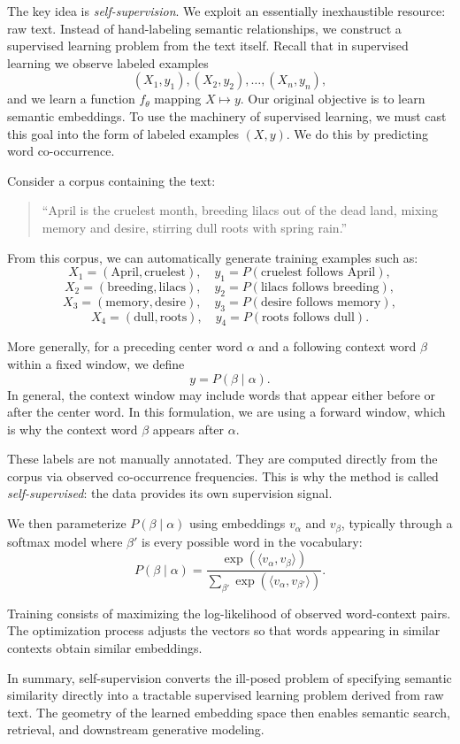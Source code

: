 \medskip

The key idea is \emph{self-supervision}. We exploit an essentially inexhaustible resource: raw text. Instead of hand-labeling semantic relationships, we construct a supervised learning problem from the text itself. Recall that in supervised learning we observe labeled examples
\[
(X_1, y_1), (X_2, y_2), \dots, (X_n, y_n),
\]
and we learn a function $f_\theta$ mapping $X \mapsto y$. Our original objective is to learn semantic embeddings. To use the machinery of supervised learning, we must cast this goal into the form of labeled examples $(X,y)$. We do this by predicting word co-occurrence.

Consider a corpus containing the text:
\begin{quote}
``April is the cruelest month, breeding lilacs out of the dead land, mixing memory and desire, stirring dull roots with spring rain.''
\end{quote}

From this corpus, we can automatically generate training examples such as:
\[
X_1 = (\text{April}, \text{cruelest}), 
\quad 
y_1 = P(\text{cruelest follows April}),
\]
\[
X_2 = (\text{breeding}, \text{lilacs}), 
\quad 
y_2 = P(\text{lilacs follows breeding}),
\]
\[
X_3 = (\text{memory}, \text{desire}), 
\quad 
y_3 = P(\text{desire follows memory}),
\]
\[
X_4 = (\text{dull}, \text{roots}), 
\quad 
y_4 = P(\text{roots follows dull}).
\]

More generally, for a preceding center word $\alpha$ and a following context word $\beta$ within a fixed window, we define
\[
y = P(\beta \mid \alpha).
\]
In general, the context window may include words that appear either before or after the center word. In this formulation, we are using a forward window, which is why the context word $\beta$ appears after $\alpha$.

These labels are not manually annotated. They are computed directly from the corpus via observed co-occurrence frequencies. This is why the method is called \emph{self-supervised}: the data provides its own supervision signal.

\medskip

We then parameterize $P(\beta \mid \alpha)$ using embeddings $v_\alpha$ and $v_\beta$, typically through a softmax model where $\beta'$ is every possible word in the vocabulary:
\[
P(\beta \mid \alpha)
=
\frac{\exp(\langle v_\alpha, v_\beta \rangle)}
{\sum_{\beta'} \exp(\langle v_\alpha, v_{\beta'} \rangle)}.
\]

Training consists of maximizing the log-likelihood of observed word-context pairs. The optimization process adjusts the vectors so that words appearing in similar contexts obtain similar embeddings.

In summary, self-supervision converts the ill-posed problem of specifying semantic similarity directly into a tractable supervised learning problem derived from raw text. The geometry of the learned embedding space then enables semantic search, retrieval, and downstream generative modeling.

\bigskip

